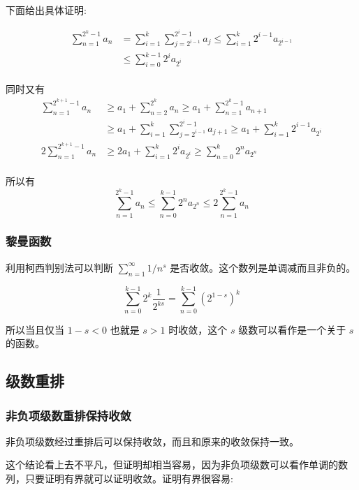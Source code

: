 下面给出具体证明:

\begin{align*}
\sum_{n=1}^{2^k - 1}a_n & = \sum_{i=1}^{k}\sum_{j=2^{i-1}}^{2^i-1}a_j \le \sum_{i=1}^{k}2^{i-1}a_{2^{i-1}} \\
& \le \sum_{i=0}^{k-1}2^ia_{2^i}
\end{align*} \\

同时又有 \\

\begin{align*}
\sum_{n=1}^{2^{k+1}-1}a_n & \ge a_1 + \sum_{n=2}^{2^k}a_n \ge a_1 + \sum_{n=1}^{2^k-1}a_{n+1} \\
 & \ge a_1 + \sum_{i=1}^{k}\sum_{j=2^{i-1}}^{2^i-1}a_{j+1} \ge a_1 + \sum_{i=1}^{k}2^{i-1}a_{2^i} \\
2\sum_{n=1}^{2^{k+1}-1}a_n & \ge 2a_1 + \sum_{i=1}^{k}2^ia_{2^i} \ge \sum_{n=0}^{k}2^na_{2^n}
\end{align*} \\

所以有  \\

\[ \sum_{n=1}^{2^k-1}a_n \le \sum_{n=0}^{k-1}2^na_{2^n} \le 2\sum_{n=1}^{2^k-1}a_n \]

\subsubsection{黎曼函数}

利用柯西判别法可以判断 $\sum_{n=1}^{\infty}1/n^s$ 是否收敛。这个数列是单调减而且非负的。

\[ \sum_{n=0}^{k-1}2^k\frac{1}{2^{ks}} = \sum_{n=0}^{k-1}(2^{1-s})^k \]

所以当且仅当 $1-s < 0$ 也就是 $s > 1$ 时收敛，这个 $s$ 级数可以看作是一个关于 $s$ 的函数。

\subsection{级数重排}


\subsubsection{非负项级数重排保持收敛}

非负项级数经过重排后可以保持收敛，而且和原来的收敛保持一致。

这个结论看上去不平凡，但证明却相当容易，因为非负项级数可以看作单调的数列，只要证明有界就可以证明收敛。证明有界很容易:

